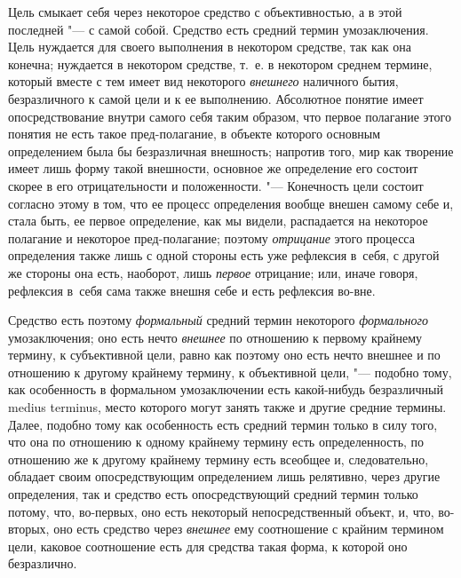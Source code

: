 Цель смыкает себя через некоторое средство с объективностью,
а в этой последней "--- с самой собой. Средство есть средний
термин умозаключения. Цель нуждается для своего выполнения в некотором
средстве, так как она конечна; нуждается в некотором средстве, т.~е. в
некотором среднем термине, который вместе с тем имеет вид некоторого
{\em внешнего} наличного
бытия, безразличного к самой цели и к ее выполнению. Абсолютное понятие
имеет опосредствование внутри самого себя таким образом, что первое
полагание этого понятия не есть такое пред-полагание, в объекте
которого основным определением была бы безразличная внешность; напротив
того, мир как творение имеет лишь форму такой внешности, основное же
определение его состоит скорее в его отрицательности и положенности. "---
Конечность цели состоит согласно этому в том, что ее процесс
определения вообще внешен самому себе и, стала быть, ее первое определение,
как мы видели, распадается на некоторое полагание и некоторое
пред-полагание; поэтому {\em отрицание}
этого процесса определения также лишь с одной стороны есть
уже рефлексия в~себя, с другой же стороны она есть, наоборот, лишь
{\em первое} отрицание; или, иначе говоря, рефлексия в~себя сама также внешня
себе и есть рефлексия во-вне.

Средство есть поэтому {\em формальный} средний термин некоторого
{\em формального} умозаключения; оно есть нечто {\em внешнее} по
отношению к первому крайнему термину, к субъективной цели, равно как
поэтому оно есть нечто внешнее и по отношению к другому крайнему термину, к
объективной цели, "--- подобно тому, как особенность в
формальном умозаключении есть какой-нибудь безразличный medius terminus,
место которого могут занять также и другие средние термины.
Далее, подобно тому как особенность есть средний термин только в силу того,
что она по отношению к одному крайнему термину есть определенность, по
отношению же к другому крайнему термину есть всеобщее и, следовательно,
обладает своим опосредствующим определением лишь релятивно, через другие
определения, так и средство есть опосредствующий средний
термин только потому, что, во-первых, оно есть некоторый непосредственный
объект, и, что, во-вторых, оно есть средство через {\em внешнее} ему
соотношение с крайним термином цели, каковое соотношение есть для средства
такая форма, к которой оно безразлично.

